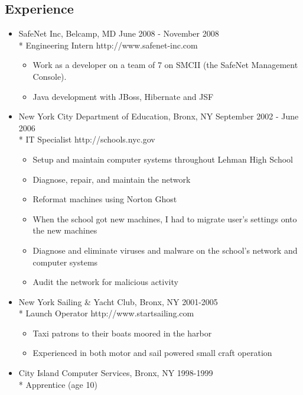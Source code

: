 \documentclass[margin]{res}
\begin{document}
\begin{resume}
\section{Experience}
	\begin{itemize} \itemsep -2pt
		\item SafeNet Inc, Belcamp, MD \hfill June 2008 - November 2008
		\\* Engineering Intern \hfill http://www.safenet-inc.com
		\begin{itemize} \itemsep -2pt
			\item Work as a developer on a team of 7 on SMCII (the SafeNet
			Management Console).
			\item Java development with JBoss, Hibernate and JSF
		\end{itemize}
		\item New York City Department of Education, Bronx, NY \hfill September 2002 - June 2006
		\\* IT Specialist \hfill http://schools.nyc.gov
		\begin{itemize} \itemsep -2pt
			\item Setup and maintain computer systems throughout Lehman High School
			\item Diagnose, repair, and maintain the network
			\item Reformat machines using Norton Ghost
			\item When the school got new machines, I had to migrate user's settings onto the new machines
			\item Diagnose and eliminate viruses and malware on the school's network and computer systems
			\item Audit the network for malicious activity
		\end{itemize}

		\item New York Sailing \& Yacht Club, Bronx, NY \hfill 2001-2005
		\\* Launch Operator \hfill http://www.startsailing.com
		\begin{itemize} \itemsep -2pt
			\item Taxi patrons to their boats moored in the harbor
			\item Experienced in both motor and sail powered small craft operation
		\end{itemize}

		\item City Island Computer Services, Bronx, NY \hfill 1998-1999
		\\* Apprentice (age 10)
	\end{itemize}


\end{resume}
\end{document}
